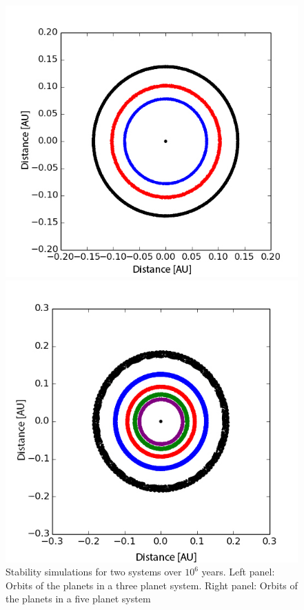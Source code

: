 \documentclass[12pt]{report}
\begin{document}
\begin{figure}
\centering
\begin{minipage}{.5\textwidth}
  \centering
  \includegraphics[width=1\linewidth]{img/180.jpg}
 

\end{minipage}%
\begin{minipage}{.5\textwidth}
  \centering
  \includegraphics[width=1\linewidth]{img/320.jpg}
  

\end{minipage}
\caption{Stability simulations for two systems over $10^6$ years. Left panel: Orbits of the planets in a three planet system. Right panel: Orbits of the planets in a five planet system}
\label{fig:stability_sim}
\end{figure}
\end{document}
